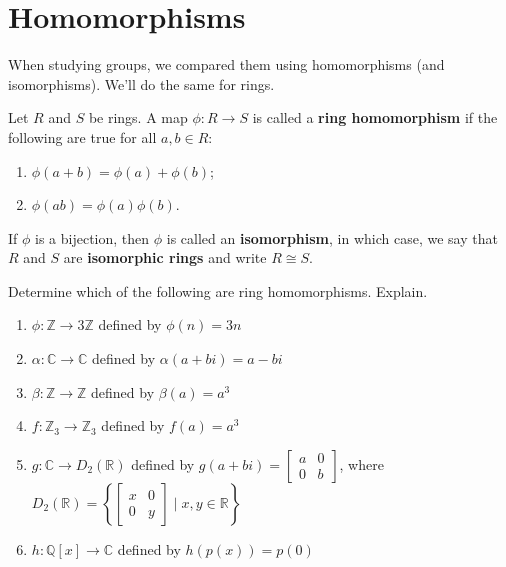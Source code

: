 \section{Homomorphisms}
When studying groups, we compared them using homomorphisms (and isomorphisms). We'll do the same for rings.

\begin{definition}
Let $R$ and $S$ be rings. A map $\phi:R\to S$ is called a \textbf{ring homomorphism} if the following are true for all $a,b\in R$:
\begin{enumerate}
\item $\phi(a+b)=\phi(a)+\phi(b)$;
\item $\phi(ab)=\phi(a)\phi(b)$.
\end{enumerate}
If $\phi$ is a bijection, then $\phi$ is called an \textbf{isomorphism}, in which case, we say that $R$ and $S$ are \textbf{isomorphic rings} and write $R\cong S$.
\end{definition}

\begin{problem}
Determine which of the following are ring homomorphisms. Explain.
\begin{enumerate}
\item $\phi: \mathbb{Z} \rightarrow 3\mathbb{Z}$ defined by $\phi(n) = 3n$
\item $\alpha: \mathbb{C} \rightarrow \mathbb{C}$ defined by $\alpha(a+bi) = a-bi$
\item $\beta: \mathbb{Z} \rightarrow \mathbb{Z}$ defined by $\beta(a) = a^3$
\item $f: \mathbb{Z}_3 \rightarrow \mathbb{Z}_3$ defined by $f(a) = a^3$
\item $g:  \mathbb{C}\rightarrow D_2\left(\mathbb{R}\right)$ defined by $\displaystyle g(a+bi) = \begin{bmatrix}a & 0 \\ 0 & b\end{bmatrix}$, where 
$\displaystyle D_2(\mathbb{R})=\left\{\begin{bmatrix}x & 0\\ 0 & y\end{bmatrix}\mid x,y\in \mathbb{R}\right\}$
\item $h: \mathbb{Q}[x] \rightarrow \mathbb{C}$ defined by $h(p(x)) = p(0)$
\end{enumerate}
\end{problem}

